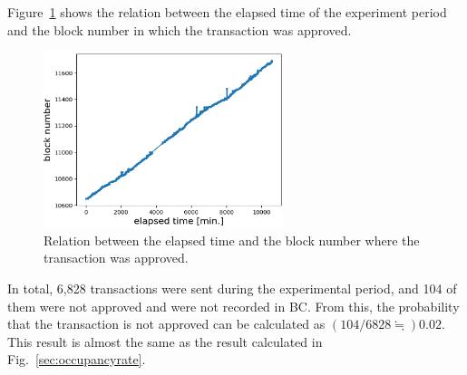 \documentclass[graybox]{svmult}
\begin{document}
Figure~\ref{fig:exp3-1} shows the relation between the elapsed time of the experiment period and the block number in which the transaction was approved. 
%
\begin{figure}[tb]
  \begin{center}
    \includegraphics[width=70mm]{exp3-1.eps}
  \end{center}
  \caption{Relation between the elapsed time and the block number where the transaction was approved.}
  \label{fig:exp3-1}
\end{figure}
%
In total, 6,828 transactions were sent during the experimental period, and 104 of them were not approved and were not recorded in BC. 
From this, the probability that the transaction is not approved can be calculated as $(104/6828 \fallingdotseq) 0.02$.
This result is almost the same as the result calculated in Fig.~\ref{sec:occupancyrate}. 
\end{document}
